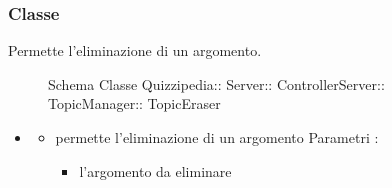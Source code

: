 \subsubsection{Classe }
Permette l'eliminazione di un argomento.
\begin{figure}[H]
\centering
\noindent{}
\caption[Schema Classe TopicEraser]{Schema Classe Quizzipedia:: Server:: ControllerServer:: TopicManager:: TopicEraser}
\end{figure}
\begin{itemize}
\item {}
\begin{itemize}
\item {}
\newline
permette l'eliminazione di un argomento
\newline
Parametri :
\begin{itemize}
\item {}
\newline
l'argomento da eliminare
\end{itemize}
\end{itemize}
\end{itemize}

